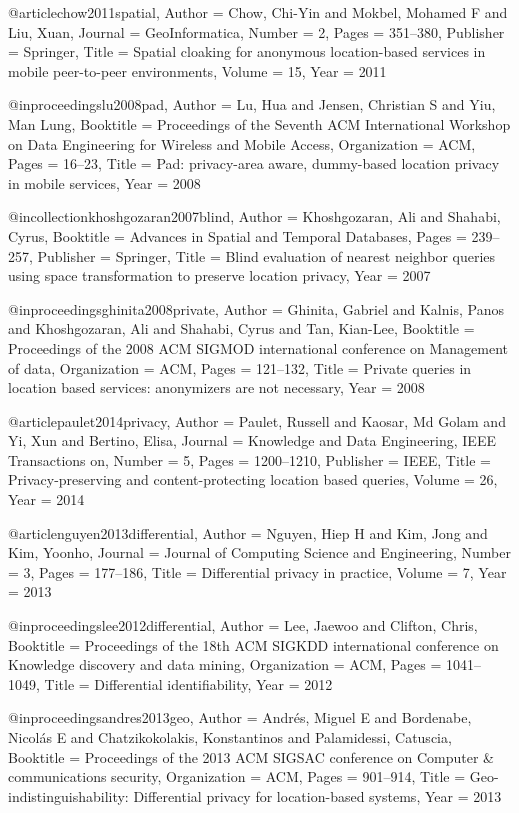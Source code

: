 {{{{{{{	@article{chow2011spatial,
	Author = {Chow, Chi-Yin and Mokbel, Mohamed F and Liu, Xuan},
	Journal = {GeoInformatica},
	Number = {2},
	Pages = {351--380},
	Publisher = {Springer},
	Title = {Spatial cloaking for anonymous location-based services in mobile peer-to-peer environments},
	Volume = {15},
	Year = {2011}}
	
	@inproceedings{lu2008pad,
	Author = {Lu, Hua and Jensen, Christian S and Yiu, Man Lung},
	Booktitle = {Proceedings of the Seventh ACM International Workshop on Data Engineering for Wireless and Mobile Access},
	Organization = {ACM},
	Pages = {16--23},
	Title = {Pad: privacy-area aware, dummy-based location privacy in mobile services},
	Year = {2008}}
	
	@incollection{khoshgozaran2007blind,
	Author = {Khoshgozaran, Ali and Shahabi, Cyrus},
	Booktitle = {Advances in Spatial and Temporal Databases},
	Pages = {239--257},
	Publisher = {Springer},
	Title = {Blind evaluation of nearest neighbor queries using space transformation to preserve location privacy},
	Year = {2007}}
	
	@inproceedings{ghinita2008private,
	Author = {Ghinita, Gabriel and Kalnis, Panos and Khoshgozaran, Ali and Shahabi, Cyrus and Tan, Kian-Lee},
	Booktitle = {Proceedings of the 2008 ACM SIGMOD international conference on Management of data},
	Organization = {ACM},
	Pages = {121--132},
	Title = {Private queries in location based services: anonymizers are not necessary},
	Year = {2008}}
	
	@article{paulet2014privacy,
	Author = {Paulet, Russell and Kaosar, Md Golam and Yi, Xun and Bertino, Elisa},
	Journal = {Knowledge and Data Engineering, IEEE Transactions on},
	Number = {5},
	Pages = {1200--1210},
	Publisher = {IEEE},
	Title = {Privacy-preserving and content-protecting location based queries},
	Volume = {26},
	Year = {2014}}
	
	@article{nguyen2013differential,
	Author = {Nguyen, Hiep H and Kim, Jong and Kim, Yoonho},
	Journal = {Journal of Computing Science and Engineering},
	Number = {3},
	Pages = {177--186},
	Title = {Differential privacy in practice},
	Volume = {7},
	Year = {2013}}
	
	@inproceedings{lee2012differential,
	Author = {Lee, Jaewoo and Clifton, Chris},
	Booktitle = {Proceedings of the 18th ACM SIGKDD international conference on Knowledge discovery and data mining},
	Organization = {ACM},
	Pages = {1041--1049},
	Title = {Differential identifiability},
	Year = {2012}}
	
	@inproceedings{andres2013geo,
	Author = {Andr{\'e}s, Miguel E and Bordenabe, Nicol{\'a}s E and Chatzikokolakis, Konstantinos and Palamidessi, Catuscia},
	Booktitle = {Proceedings of the 2013 ACM SIGSAC conference on Computer \& communications security},
	Organization = {ACM},
	Pages = {901--914},
	Title = {Geo-indistinguishability: Differential privacy for location-based systems},
	Year = {2013}}
	
}}}}}}}
